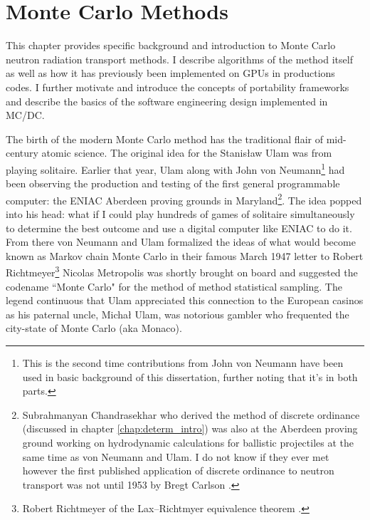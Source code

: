 \chapter{Monte Carlo Methods}


\label{chap:mc_methods_intro}


This chapter provides specific background and introduction to Monte Carlo neutron radiation transport methods.
I describe algorithms of the method itself as well as how it has previously been implemented on GPUs in productions codes.
I further motivate and introduce the concepts of portability frameworks and describe the basics of the software engineering design implemented in MC/DC.

The birth of the modern Monte Carlo method has the traditional flair of mid-century atomic science.
The original idea for the  Stanisław Ulam was from playing solitaire.
Earlier that year, Ulam along with John von Neumann\footnote{
This is the second time contributions from John von Neumann have been used in basic background of this dissertation, further noting that it's in both parts.
} had been observing the production and testing of the first general programmable computer: the ENIAC Aberdeen proving grounds in Maryland\footnote{
Subrahmanyan Chandrasekhar who derived the method of discrete ordinance (discussed in chapter \ref{chap:determ_intro}) was also at the Aberdeen proving ground working on hydrodynamic calculations for ballistic projectiles at the same time as von Neumann and Ulam. I do not know if they ever met however the first published application of discrete ordinance to neutron transport was not until 1953 by Bregt Carlson \cite{carlson_1955_sn, carlson_1958_sn}.
}.
The idea popped into his head: what if I could play hundreds of games of solitaire simultaneously to determine the best outcome and use a digital computer like ENIAC to do it.
From there von Neumann and Ulam formalized the ideas of what would become known as Markov chain Monte Carlo in their famous March 1947 letter to Robert Richtmeyer\footnote{
Robert Richtmeyer of the Lax–Richtmyer equivalence theorem \cite{Lax_1956_stability}.
}
Nicolas Metropolis was shortly brought on board and suggested the codename ``Monte Carlo" for the method of method statistical sampling.
The legend continuous that Ulam appreciated this connection to the European casinos as his paternal uncle, Michał Ulam, was notorious gambler who frequented the city-state of Monte Carlo (aka Monaco).

